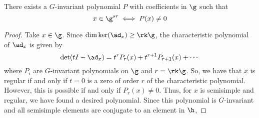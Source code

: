  \begin{lem}
   There exists a \(G\)-invariant polynomial \(P\) with coefficients
   in \(\g\) such that \[
     x \in \g^{sr} \iff P(x) \neq 0
   \]
 \end{lem}
 \begin{proof}
   Take \(x \in \g\). Since \(\dim \ker(\ad_x) \geq \rk \g\), the
   characteristic polynomial of \(\ad_x\) is 
   given by \[
     \det(tI - \ad_x) = t^r P_r(x) + t^{r+1} P_{r+1}(x) + \cdots
   \]
   where \(P_i\) are \(G\)-invariant polynomials on \(\g\) and \(r =
   \rk \g\). So, we have that \(x\) is regular if and only if \(t =
   0\) is a zero of order \(r\) of the characteristic
   polynomial. However, this is possible if and only if \(P_r(x) \neq
   0\). Thus, for \(x\) is semisimple and regular, we have found a desired
   polynomial. Since this polynomial is \(G\)-invariant and all
   semisimple elements are conjugate to an element in \(\h\),
 \end{proof}
